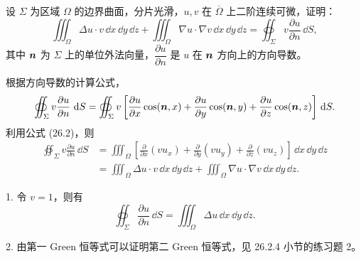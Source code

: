 \begin{xexample}
设 $\Sigma$ 为区域 $\Omega$ 的边界曲面，分片光滑，$u,v$ 在 $\overline\Omega$ 上二阶连续可微，证明：
\[
  \iiint_\Omega \Delta u\cdot v\,\dd x\,\dd y\,\dd z
  +\iiint_\Omega \nabla u\cdot\nabla v\,\dd x\,\dd y\,\dd z
  =\oiint_\Sigma v\frac{\partial u}{\partial n}\,\dd S,
\]
其中 $\bm{n}$ 为 $\Sigma$ 上的单位外法向量，$\dfrac{\partial u}{\partial n}$ 是 $u$ 在 $\bm{n}$ 方向上的方向导数。
\end{xexample}
\begin{xproof}
根据方向导数的计算公式，
\[
  \oiint_\Sigma v\frac{\partial u}{\partial n}\,\mathop{}\!\mathrm{d} S
  =\oiint_\Sigma v\left[
    \frac{\partial u}{\partial x}\cos(\bm{n},x)
    +\frac{\partial u}{\partial y}\cos(\bm{n},y)
    +\frac{\partial u}{\partial z}\cos(\bm{n},z)
  \right]\,\mathop{}\!\mathrm{d} S.
\]
利用公式 (26.2)，则
\begin{align*}
  \oiint_\Sigma v\frac{\partial u}{\partial n}\,\dd S
  &=\iiint_\Omega\left[
    \frac{\partial}{\partial x}\left(vu_x\right)
    +\frac{\partial}{\partial y}\left(vu_y\right)
    +\frac{\partial}{\partial z}\left(vu_z\right)
  \right]\,\dd x\,\dd y\,\dd z\\
  &=\iiint_\Omega \Delta u\cdot v\,\dd x\,\dd y\,\dd z
  +\iiint_\Omega \nabla u\cdot\nabla v\,\dd x\,\dd y\,\dd z.
\end{align*}
\end{xproof}
\begin{xremark}
1. 令 $v=1$，则有
\begin{equation}
  \oiint_\Sigma\frac{\partial u}{\partial n}\,\dd S
  =\iiint_\Omega\Delta u\,\dd x\,\dd y\,\dd z.
  \tag{26.15}
  \label{eq:26.15}
\end{equation}

2. 由第一 Green 恒等式可以证明第二 Green 恒等式，见 26.2.4 小节的练习题 2。
\end{xremark}

